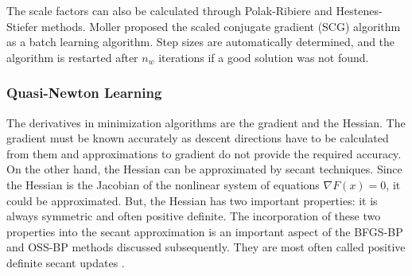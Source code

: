 The scale factors can also be calculated through Polak-Ribiere and Hestenes-Stiefer methods. Moller \cite{moller1993scaled} proposed the scaled conjugate gradient (SCG) algorithm as a batch learning algorithm. Step sizes are automatically determined, and the algorithm is restarted after $n_w$ iterations if a good solution was not found.

\subsubsection{Quasi-Newton Learning}

The derivatives in minimization algorithms are the gradient and the Hessian. The gradient must be known accurately as descent directions have to be calculated from them and approximations to gradient do not provide the required accuracy. On the other hand, the Hessian can be approximated by secant techniques. Since the Hessian is the Jacobian of the nonlinear system of equations $\nabla F(x) = 0$, it could be approximated. But, the Hessian has two important properties: it is always symmetric and often positive definite. The incorporation of these two properties into the secant approximation is an important aspect of the BFGS-BP and OSS-BP methods discussed subsequently. They are most often called positive definite secant updates \cite{saini2002artificial}.

